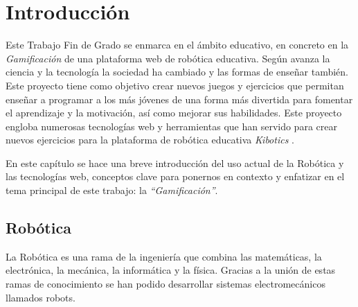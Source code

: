 \chapter{Introducción}
\label{chap:introduccion} 
Este Trabajo Fin de Grado se enmarca en el ámbito educativo, en concreto en la \textit{Gamificación} de una plataforma web de robótica educativa. Según avanza la ciencia y la tecnología la sociedad ha cambiado y las formas de enseñar también. Este proyecto tiene como objetivo crear nuevos juegos y ejercicios que permitan enseñar a programar a los más jóvenes de una forma más divertida para fomentar el aprendizaje y la motivación, así como mejorar sus habilidades. Este proyecto engloba numerosas tecnologías web y herramientas que han servido para crear nuevos ejercicios para la plataforma de robótica educativa \textit{Kibotics} \cite{intro}.

En este capítulo se hace una breve introducción del uso actual de la Robótica y las tecnologías web, conceptos clave para ponernos en contexto y enfatizar en el tema principal de este trabajo: la \textit{``Gamificación''}.


\section{Robótica}\label{motivacion}
La Robótica es una rama de la ingeniería que combina las matemáticas, la electrónica, la mecánica, la informática y la física. Gracias a la unión de estas ramas de conocimiento se han podido desarrollar sistemas electromecánicos llamados robots. 

